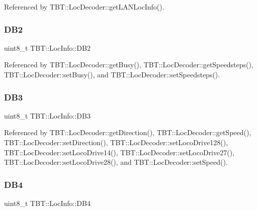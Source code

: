 Referenced by T\+B\+T\+::\+Loc\+Decoder\+::get\+L\+A\+N\+Loc\+Info().

\mbox{\label{structTBT_1_1LocInfo_a3afd371cc25c979fac7ac0af9f1ad48a_a3afd371cc25c979fac7ac0af9f1ad48a}} 
\subsubsection{\texorpdfstring{D\+B2}{DB2}}
{\footnotesize\ttfamily uint8\+\_\+t T\+B\+T\+::\+Loc\+Info\+::\+D\+B2}



Referenced by T\+B\+T\+::\+Loc\+Decoder\+::get\+Busy(), T\+B\+T\+::\+Loc\+Decoder\+::get\+Speedsteps(), T\+B\+T\+::\+Loc\+Decoder\+::set\+Busy(), and T\+B\+T\+::\+Loc\+Decoder\+::set\+Speedsteps().

\mbox{\label{structTBT_1_1LocInfo_aa2e76b63a3657b7fe1bf602186a416fa_aa2e76b63a3657b7fe1bf602186a416fa}} 
\subsubsection{\texorpdfstring{D\+B3}{DB3}}
{\footnotesize\ttfamily uint8\+\_\+t T\+B\+T\+::\+Loc\+Info\+::\+D\+B3}



Referenced by T\+B\+T\+::\+Loc\+Decoder\+::get\+Direction(), T\+B\+T\+::\+Loc\+Decoder\+::get\+Speed(), T\+B\+T\+::\+Loc\+Decoder\+::set\+Direction(), T\+B\+T\+::\+Loc\+Decoder\+::set\+Loco\+Drive128(), T\+B\+T\+::\+Loc\+Decoder\+::set\+Loco\+Drive14(), T\+B\+T\+::\+Loc\+Decoder\+::set\+Loco\+Drive27(), T\+B\+T\+::\+Loc\+Decoder\+::set\+Loco\+Drive28(), and T\+B\+T\+::\+Loc\+Decoder\+::set\+Speed().

\mbox{\label{structTBT_1_1LocInfo_aa6b13fcc4b2b02ba839f91bb78e37b50_aa6b13fcc4b2b02ba839f91bb78e37b50}} 
\subsubsection{\texorpdfstring{D\+B4}{DB4}}
{\footnotesize\ttfamily uint8\+\_\+t T\+B\+T\+::\+Loc\+Info\+::\+D\+B4}



